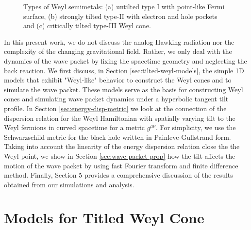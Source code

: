 \documentclass[%
 aip,
 amsmath,amssymb,
 reprint,%
]{revtex4-1}
\begin{document}
\begin{figure}
  \vspace*{8pt}
  \caption{Types of Weyl semimetals: (a) untilted type I with point-like Fermi surface, (b) strongly tilted type-II with electron and hole pockets and (c) critically tilted type-III Weyl cone.}\label{fig:weyl-type}
\end{figure}

In this present work, we do not discuss the analog Hawking radiation nor the complexity of the changing gravitational field. Rather, we only deal with the dynamics of the wave packet by fixing the spacetime geometry and neglecting the back reaction. We first discuss, in Section \ref{sec:tilted-weyl-models}, the simple 1D models that exhibit "Weyl-like" behavior to construct the Weyl cones and to simulate the wave packet. These models serve as the basis for constructing Weyl cones and simulating wave packet dynamics under a hyperbolic tangent tilt profile. In Section \ref{sec:energy-disp-metric} we look at the connection of the dispersion relation for the Weyl Hamiltonian with spatially varying tilt to the Weyl fermions in curved spacetime for a metric $g^{\mu \nu}$. For simplicity, we use the Schwarzschild metric for the black hole written in Painleve-Gullstrand form. Taking into account the linearity of the energy dispersion relation close the the Weyl point, we show in Section \ref{sec:wave-packet-prop} how the tilt affects the motion of the wave packet by using fast Fourier transform and finite difference method. Finally, Section 5 provides a comprehensive discussion of the results obtained from our simulations and analysis.

\section{\label{sec:tilted-weyl-models}Models for Titled Weyl Cone}
\end{document}
